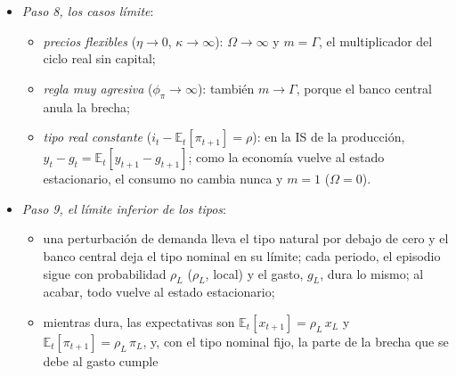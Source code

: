 \documentclass[11pt]{article}
\begin{document}
\begin{itemize}
\begin{itemize}
  \item de la curva de , $\psi_\pi\,(1-\beta\rho_G)=\kappa\,\psi_x$;
  \item de la IS, con \eqref{eq:taylor-gasto} sin $\varepsilon_t$, $\theta\,(1-\rho_G)\,\psi_x=-(\phi_\pi-\rho_G)\,\psi_\pi-\phi_x\,\psi_x+\theta\,(1-\Gamma)(1-\rho_G)$;
  \item sustituyendo $\psi_\pi$ y llamando
    \begin{equation*}
    \Omega\equiv\frac{\kappa\,(\phi_\pi-\rho_G)+\phi_x\,(1-\beta\rho_G)}{\theta\,(1-\rho_G)(1-\beta\rho_G)}>0
    \end{equation*}
    ($\Omega$, local), $\psi_x=(1-\Gamma)/(1+\Omega)$;
  \item el multiplicador es lo que sube la producción natural más lo que sube la brecha:
    \begin{equation}\label{eq:multiplicador-nek}
    m=\Gamma+\psi_x=\frac{1+\Omega\,\Gamma}{1+\Omega}\in(\Gamma,1),
    \end{equation}
    una media ponderada de 1~y de $\Gamma$, y el consumo cae, $m-1<0$. \findemo
  \end{itemize}
\item \emph{Paso 8, los casos límite}:
  \begin{itemize}
  \item \emph{precios flexibles} ($\eta\to0$, $\kappa\to\infty$): $\Omega\to\infty$ y $m=\Gamma$, el multiplicador del ciclo real sin capital;
  \item \emph{regla muy agresiva} ($\phi_\pi\to\infty$): también $m\to\Gamma$, porque el banco central anula la brecha;
  \item \emph{tipo real constante} ($i_t-\mathbb{E}_t[\pi_{t+1}]=\rho$): en la IS de la producción, $y_t-g_t=\mathbb{E}_t[y_{t+1}-g_{t+1}]$; como la economía vuelve al estado estacionario, el consumo no cambia nunca y $m=1$ ($\Omega=0$). \findemo
  \end{itemize}
\item \emph{Paso 9, el límite inferior de los tipos}:
  \begin{itemize}
  \item una perturbación de demanda lleva el tipo natural por debajo de cero y el banco central deja el tipo nominal en su límite; cada periodo, el episodio sigue con probabilidad $\rho_L$ ($\rho_L$, local) y el gasto, $g_L$, dura lo mismo; al acabar, todo vuelve al estado estacionario;
  \item mientras dura, las expectativas son $\mathbb{E}_t[x_{t+1}]=\rho_L\,x_L$ y $\mathbb{E}_t[\pi_{t+1}]=\rho_L\,\pi_L$, y, con el tipo nominal fijo, la parte de la brecha que se debe al gasto cumple

\end{itemize}
\end{itemize}
\end{document}
